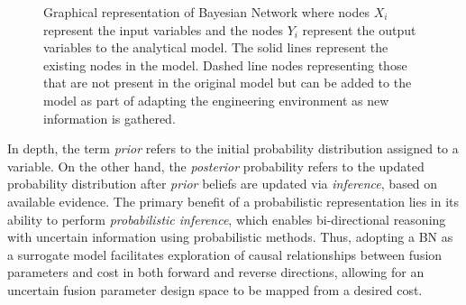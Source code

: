\documentclass[journal]{IEEEtran}
\begin{document}
\begin{figure}[ht]
    \centering
    \caption{\small Graphical representation of Bayesian Network where nodes $X_i$ represent the input variables and the nodes $Y_i$ represent the output variables to the analytical model. The solid lines represent the existing nodes in the model. Dashed line nodes representing those that are not present in the original model but can be added to the model as part of adapting the engineering environment as new information is gathered.}\label{fig:BN3} 
    \vspace{-15pt}
\end{figure}

In depth, the term \textit{prior} refers to the initial probability distribution assigned to a variable. On the other hand, the \textit{posterior} probability refers to the updated probability distribution after \textit{prior} beliefs are updated via \textit{inference}, based on available evidence. The primary benefit of a probabilistic representation lies in its ability to perform \textit{probabilistic inference}, which enables bi-directional reasoning with uncertain information using probabilistic methods. Thus, adopting a BN as a surrogate model facilitates exploration of causal relationships between fusion parameters and cost in both forward and reverse directions, allowing for an uncertain fusion parameter design space to be mapped from a desired cost. 
\end{document}
